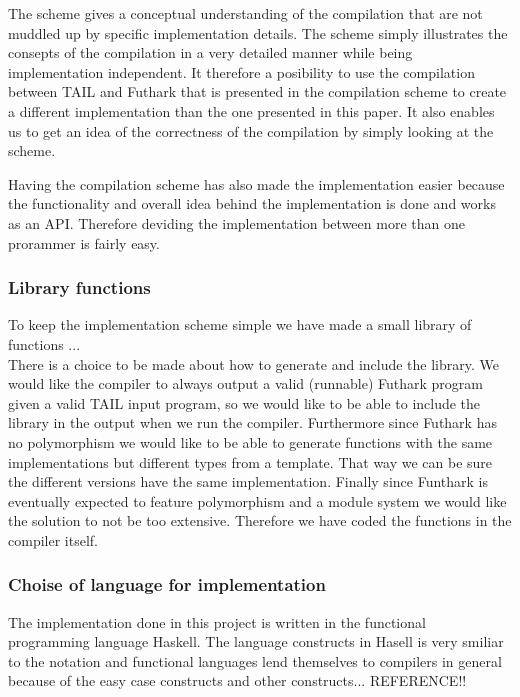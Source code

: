 \documentclass[11pt]{article}
\begin{document}
The scheme gives a conceptual understanding of the compilation that are not muddled up by specific implementation details. The scheme simply illustrates the consepts of the compilation in a very detailed manner while being implementation independent. It therefore a posibility to use the compilation between TAIL and Futhark that is presented in the compilation scheme to create a different implementation than the one presented in this paper.
It also enables us to get an idea of the correctness of the compilation by simply looking at the scheme. 

Having the compilation scheme has also made the implementation easier because the functionality and overall idea behind the implementation is done and works as an API. Therefore deviding the implementation between more than one prorammer is fairly easy. 

\subsubsection{Library functions}
To keep the implementation scheme simple we have made a small library of functions ...\\ %
There is a choice to be made about how to generate and include the library.
We would like the compiler to always output a valid (runnable) Futhark program given a valid TAIL input program, so we would like to
be able to include the library in the output when we run the compiler.
Furthermore since Futhark has no polymorphism we would like to be able to
generate functions with the same implementations but different types from a template.
That way we can be sure the different versions have the same implementation.
Finally since Funthark is eventually expected to feature polymorphism and a module system we would like the solution to not be too
extensive\cite{TroelsHenriksen}. Therefore we have coded the functions in the compiler itself.

\subsubsection{Choise of language for implementation}
The implementation done in this project is written in the functional programming language Haskell. The language constructs in Hasell is very smiliar to the notation and functional languages lend themselves to compilers in general because of the easy case constructs and other constructs... REFERENCE!! \\%
\end{document}

